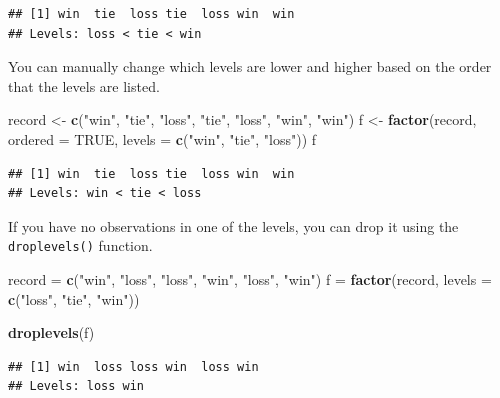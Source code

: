\documentclass[
]{book}
\newenvironment{Shaded}{\begin{snugshade}}{\end{snugshade}}
\newcommand{\DataTypeTok}[1]{\textcolor[rgb]{0.13,0.29,0.53}{#1}}
\newcommand{\KeywordTok}[1]{\textcolor[rgb]{0.13,0.29,0.53}{\textbf{#1}}}
\newcommand{\NormalTok}[1]{#1}
\newcommand{\OtherTok}[1]{\textcolor[rgb]{0.56,0.35,0.01}{#1}}
\newcommand{\StringTok}[1]{\textcolor[rgb]{0.31,0.60,0.02}{#1}}
\begin{document}
\begin{verbatim}
## [1] win  tie  loss tie  loss win  win 
## Levels: loss < tie < win
\end{verbatim}

You can manually change which levels are lower and higher based on the order that the levels are listed.

\begin{Shaded}
\begin{Highlighting}[]
\NormalTok{record <-}\StringTok{ }\KeywordTok{c}\NormalTok{(}\StringTok{"win"}\NormalTok{, }\StringTok{"tie"}\NormalTok{, }\StringTok{"loss"}\NormalTok{, }\StringTok{"tie"}\NormalTok{, }\StringTok{"loss"}\NormalTok{, }\StringTok{"win"}\NormalTok{, }\StringTok{"win"}\NormalTok{)}
\NormalTok{f <-}\StringTok{ }\KeywordTok{factor}\NormalTok{(record, }\DataTypeTok{ordered =} \OtherTok{TRUE}\NormalTok{, }\DataTypeTok{levels =} \KeywordTok{c}\NormalTok{(}\StringTok{"win"}\NormalTok{, }\StringTok{"tie"}\NormalTok{,}
    \StringTok{"loss"}\NormalTok{))}
\NormalTok{f}
\end{Highlighting}
\end{Shaded}

\begin{verbatim}
## [1] win  tie  loss tie  loss win  win 
## Levels: win < tie < loss
\end{verbatim}

If you have no observations in one of the levels, you can drop it using the \texttt{droplevels()} function.

\begin{Shaded}
\begin{Highlighting}[]
\NormalTok{record =}\StringTok{ }\KeywordTok{c}\NormalTok{(}\StringTok{"win"}\NormalTok{, }\StringTok{"loss"}\NormalTok{, }\StringTok{"loss"}\NormalTok{, }\StringTok{"win"}\NormalTok{, }\StringTok{"loss"}\NormalTok{, }\StringTok{"win"}\NormalTok{)}
\NormalTok{f =}\StringTok{ }\KeywordTok{factor}\NormalTok{(record, }\DataTypeTok{levels =} \KeywordTok{c}\NormalTok{(}\StringTok{"loss"}\NormalTok{, }\StringTok{"tie"}\NormalTok{, }\StringTok{"win"}\NormalTok{))}

\KeywordTok{droplevels}\NormalTok{(f)}
\end{Highlighting}
\end{Shaded}

\begin{verbatim}
## [1] win  loss loss win  loss win 
## Levels: loss win
\end{verbatim}
\end{document}
